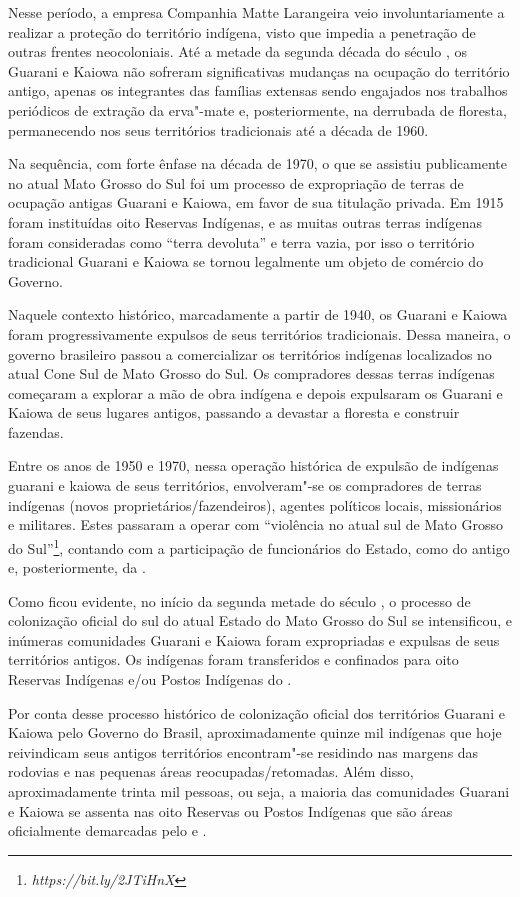 Nesse período, a empresa Companhia Matte Larangeira veio
involuntariamente a realizar a proteção do território indígena, visto
que impedia a penetração de outras frentes neocoloniais. Até a metade
da segunda década do século , os Guarani e Kaiowa não sofreram
significativas mudanças na ocupação do território antigo, apenas os
integrantes das famílias extensas sendo engajados nos trabalhos
periódicos de extração da erva"-mate e, posteriormente, na derrubada de
floresta, permanecendo nos seus territórios tradicionais até a década
de 1960.

Na sequência, com forte ênfase na década de 1970, o que se assistiu
publicamente no atual Mato Grosso do Sul foi um processo de
expropriação de terras de ocupação antigas Guarani e Kaiowa, em favor
de sua titulação privada. Em 1915 foram instituídas oito Reservas
Indígenas, e as muitas outras terras indígenas foram consideradas como
``terra devoluta'' e terra vazia, por isso o território tradicional
Guarani e Kaiowa se tornou legalmente um objeto de comércio do Governo.


Naquele contexto histórico, marcadamente a partir de 1940, os Guarani e
Kaiowa foram progressivamente expulsos de seus territórios
tradicionais. Dessa maneira, o governo brasileiro passou a
comercializar os territórios indígenas localizados no atual Cone Sul de
Mato Grosso do Sul. Os compradores dessas terras indígenas começaram a
explorar a mão de obra indígena e depois expulsaram os Guarani e Kaiowa
de seus lugares antigos, passando a devastar a floresta e construir
fazendas.

Entre os anos de 1950 e 1970, nessa operação histórica de expulsão de
indígenas guarani e kaiowa de seus territórios, envolveram"-se os
compradores de terras indígenas (novos proprietários/fazendeiros),
agentes políticos locais, missionários e militares. Estes passaram a
operar com ``violência no atual sul de Mato Grosso do Sul''\footnote{\emph{https://bit.ly/2JTiHnX}}, contando com a
participação de funcionários do Estado, como do antigo  e,
posteriormente, da . 

Como ficou evidente, no início da segunda metade do século , o
processo de colonização oficial do sul do atual Estado do Mato Grosso
do Sul se intensificou, e inúmeras comunidades Guarani e Kaiowa foram
expropriadas e expulsas de seus territórios antigos. Os indígenas foram
transferidos e confinados para oito Reservas Indígenas e/ou Postos
Indígenas do . 

Por conta desse processo histórico de colonização oficial dos
territórios Guarani e Kaiowa pelo Governo do Brasil, aproximadamente
quinze mil indígenas que hoje reivindicam seus antigos territórios
encontram"-se residindo nas margens das rodovias e nas pequenas áreas
reocupadas/retomadas. Além disso, aproximadamente trinta mil pessoas,
ou seja, a maioria das comunidades Guarani e Kaiowa se assenta nas oito
Reservas ou Postos Indígenas que são áreas oficialmente demarcadas pelo
 e . 

